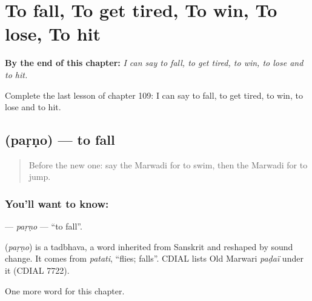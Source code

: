 
\chapter{To fall, To get tired, To win, To lose, To hit}
\label{ch:mw-to-fall-to-get-tired-to-win-to-lose-to-hit}

\begin{chapteropening}
\textbf{By the end of this chapter:} \emph{I can say to fall, to get tired, to win, to lose and to hit.}

Complete the last lesson of chapter 109: I can say to fall, to get tired, to win, to lose and to hit.
\end{chapteropening}

\section[\texorpdfstring{\mw{पड़णो} (paṛṇo)}{पड़णो (paṛṇo)}]{ (paṛṇo) — to fall}

\label{lesson:MW-C109-parno}



\begin{quote}
Before the new one: say the Marwadi for to swim, then the Marwadi for to jump.
\end{quote}

\subsection*{You'll want to know: }
\textbf{} — \emph{paṛṇo} — \textquotedblleft{}to fall\textquotedblright{}.

\begin{cousinweb}
\textbf{} (\emph{paṛṇo}) is a tadbhava, a word inherited from Sanskrit and reshaped by sound change. It comes from \emph{patati}, \textquotedblleft{}flies; falls\textquotedblright{}. CDIAL lists Old Marwari \emph{paḍaï} under it (CDIAL 7722).
\end{cousinweb}

\begin{grammarlens}[title={What you've built}]
One more word for this chapter.
\end{grammarlens}

